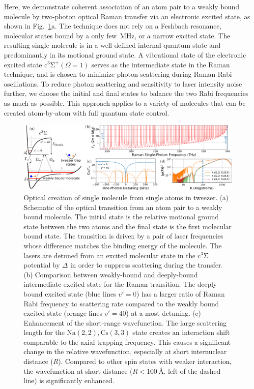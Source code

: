 \documentclass[aps,prl,twocolumn,10pt,superscriptaddress]{revtex4-1}
\newcommand{\Na}{\mathrm{Na}}
\newcommand{\Cs}{\mathrm{Cs}}
\begin{document}
Here, we demonstrate coherent association of an atom pair to a weakly bound molecule
by two-photon optical Raman transfer via an electronic excited state,
as shown in Fig.~\ref{f-theory}a.
The technique does not rely on a Feshbach resonance,
molecular states bound by a only few~MHz, or a narrow excited state.
The resulting single molecule is in a well-defined internal quantum state
and predominantly in its motional ground state.
A vibrational state of the electronic excited state $\mathrm{c^3\Sigma^+}(\Omega = 1)$
serves as the intermediate state in the Raman technique,
and is chosen to minimize photon scattering during Raman Rabi oscillations.
To reduce photon scattering and sensitivity to laser intensity noise further,
we choose the initial and final states to balance the two Rabi frequencies as much as possible.
This approach applies to a variety of molecules that can be created atom-by-atom with full quantum state control.


\begin{figure}
  \includegraphics[width=\textwidth]{imgs/fig-theory.pdf}
  \caption{Optical creation of single molecule from single atoms in tweezer.
    (a) Schematic of the optical transition from an atom pair to a weakly bound molecule.
    The initial state is the relative motional ground state between the two atoms
    and the final state is the first molecular bound state.
    The transition is driven by a pair of laser frequencies whose difference matches the binding energy
    of the molecule.
    The lasers are detuned from an excited molecular state in the $\mathrm{c^3\Sigma}$ potential
    by $\Delta$ in order to suppress scattering during the transfer.
    (b) Comparison between weakly-bound and deeply-bound intermediate excited state
    for the Raman transition.
    The deeply bound excited state (blue lines $v'=0$)
    has a larger ratio of Raman Rabi frequency to scattering rate
    compared to the weakly bound excited state (orange lines $v'=40$) at a most detuning.
    (c) Enhancement of the short-range wavefunction.
    The large scattering length for the $\Na(2,2),\Cs(3,3)$ state creates an interaction shift
    comparable to the axial trapping frequency.
    This causes a significant change in the relative wavefunction, especially at short
    internuclear distance ($R$).
    Compared to other spin states with weaker interaction,
    the wavefunction at short distance ($R<100\ \text{\AA}$, left of the dashed line)
    is significantly enhanced.
    \label{f-theory}
  }
\end{figure}
\end{document}
